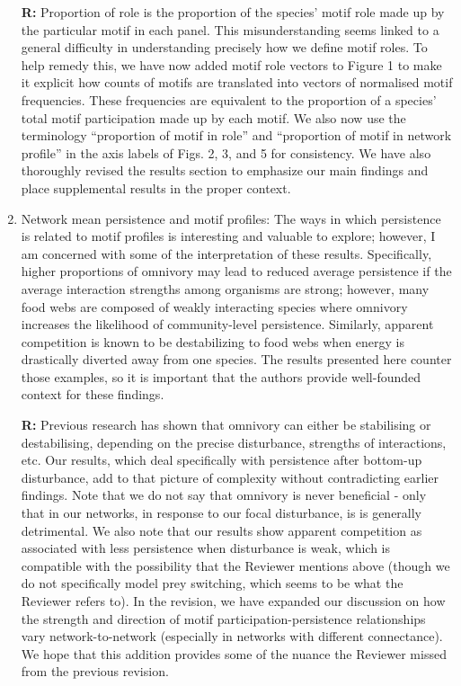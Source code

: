 \documentclass[12pt]{article}
\begin{document}
\begin{enumerate}
                \textbf{R:} Proportion of role is the proportion of the species' motif role made up by the particular motif in each panel. This misunderstanding seems linked to a general difficulty in understanding precisely how we define motif roles. To help remedy this, we have now added motif role vectors to Figure 1 to make it explicit how counts of motifs are translated into vectors of normalised motif frequencies. These frequencies are equivalent to the proportion of a species' total motif participation made up by each motif. We also now use the terminology ``proportion of motif in role'' and ``proportion of motif in network profile'' in the axis labels of Figs. 2, 3, and 5 for consistency. We have also thoroughly revised the results section to emphasize our main findings and place supplemental results in the proper context.


            \item Network mean persistence and motif profiles: The ways in which persistence is related to motif profiles is interesting and valuable to explore; however, I am concerned with some of the interpretation of these results. Specifically, higher proportions of omnivory may lead to reduced average persistence if the average interaction strengths among organisms are strong; however, many food webs are composed of weakly interacting species where omnivory increases the likelihood of community-level persistence. Similarly, apparent competition is known to be destabilizing to food webs when energy is drastically diverted away from one species. The results presented here counter those examples, so it is important that the authors provide well-founded context for these findings.

                \textbf{R:} Previous research has shown that omnivory can either be stabilising or destabilising, depending on the precise disturbance, strengths of interactions, etc. Our results, which deal specifically with persistence after bottom-up disturbance, add to that picture of complexity without contradicting earlier findings. Note that we do not say that omnivory is never beneficial - only that in our networks, in response to our focal disturbance, is is generally detrimental. We also note that our results show apparent competition as associated with less persistence when disturbance is weak, which is compatible with the possibility that the Reviewer mentions above (though we do not specifically model prey switching, which seems to be what the Reviewer refers to).  In the revision, we have expanded our discussion on how the strength and direction of motif participation-persistence relationships vary network-to-network (especially in networks with different connectance). We hope that this addition provides some of the nuance the Reviewer missed from the previous revision.



\end{enumerate}
\end{document}
